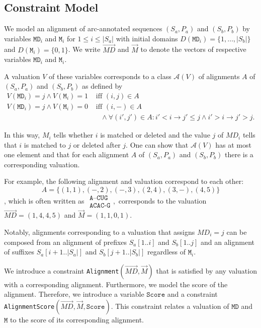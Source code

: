 \documentclass{easychair}
\begin{document}
\newcommand{\var}{\texttt}
\newcommand{\cA}{{\mathcal A}}
\subsection{Constraint Model}

We model an alignment of arc-annotated sequences $(S_a,P_a)$ and
$(S_b,P_b)$ by variables $\var{MD}_i$ and $\var{M}_i$ for $1\leq i\leq
|S_a|$ with initial domains $D(\var{MD}_i) = \{1,\dots,|S_b|\}$ and
$D(\var{M}_i)=\{0,1\}$. We write $\vec{MD}$ and $\vec{M}$ to
denote the vectors of respective variables $\var{MD}_i$ and
$\var{M}_i$.

A valuation $V$ of these variables corresponds to a class $\cA(V)$ of
alignments $A$ of $(S_a,P_a)$ and $(S_b,P_b)$ as defined by
\begin{align*}
  V(\var{MD}_i)=j \land V(\var{M}_i)=1 &\text{ iff } (i,j) \in A  \\
  V(\var{MD}_i)=j \land V(\var{M}_i)=0 &\text{ iff } (i,-) \in A \\&\quad\land \forall (i',j')\in A: i'< i \rightarrow j'\leq j \land i'>i \rightarrow j'>j.
\end{align*}

In this way, $M_i$ tells whether $i$ is matched or deleted and the
value $j$ of $MD_i$ tells that $i$ is matched to $j$ or deleted after
$j$. One can show that $\cA(V)$ has at most one element and that for
each alignment $A$ of $(S_a,P_a)$ and $(S_b,P_b)$ there is a
corresponding valuation.

For example, the following alignment and valuation correspond to each
other: $$A=\{(1,1),(-,2),(-,3),(2,4),(3,-),(4,5)\}$$, which is often written as
$\begin{array}{c}
\texttt{A--CUG}\\
\texttt{ACAC-G}
\end{array},$
corresponds to the valuation $\vec{MD}=(1,4,4,5)$ and $\vec{M}=(1,1,0,1)$.

Notably, alignments corresponding to a valuation that assigns $MD_i=j$
can be composed from an alignment of prefixes $S_a[1..i]$ and
$S_b[1..j]$ and an alignment of suffixes $S_a[i+1..|S_a|]$ and $S_b[j+1..|S_b|]$
regardless of $\var{M}_i$.

We introduce a constraint \texttt{Alignment}$(\vec{MD},\vec{M})$ that
is satisfied by any valuation with a corresponding alignment.
Furthermore, we model the score of the alignment. Therefore, we
introduce a variable $\var{Score}$ and a constraint
\texttt{AlignmentScore}$(\vec{MD},\vec{M},\var{Score})$. This
constraint relates a valuation of $\var{MD}$ and $\var{M}$ to the
score of its corresponding alignment.
\end{document}
